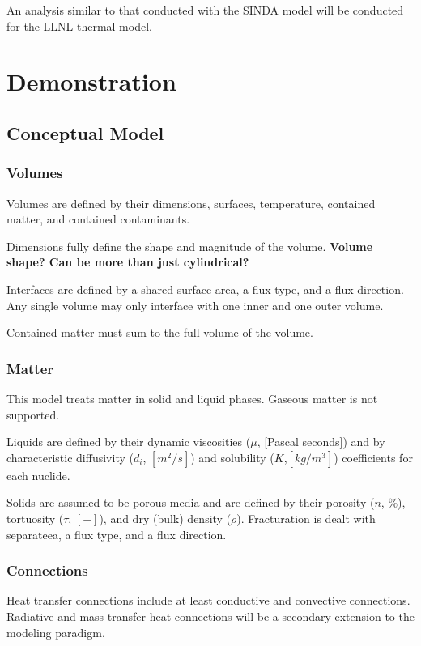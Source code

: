 An analysis similar to that conducted with the SINDA model will be conducted 
for the LLNL thermal model.

\section{Demonstration}

\subsection{Conceptual Model}

\subsubsection{Volumes}

Volumes are defined by their dimensions, surfaces, temperature, contained matter, and 
contained contaminants. 

Dimensions fully define the shape and magnitude of the volume.
\textbf{Volume shape? Can be more than just cylindrical?}

Interfaces are defined by a shared surface area, a flux type, and a flux 
direction. Any single volume may only interface with one inner and one outer 
volume. 

Contained matter must sum to the full volume of the volume.

\subsubsection{Matter}

This model treats matter in solid and liquid phases. Gaseous matter is not 
supported. 


Liquids are defined by their dynamic viscosities ($\mu$, [Pascal seconds]) and
by characteristic diffusivity ($d_i$, $[m^2/s]$) and solubility ($K$,$[kg/m^3]$) 
coefficients for each nuclide.  


Solids are assumed to be porous media and are defined by their porosity 
($n$, $\%$), tortuosity ($\tau$, $[-]$), and dry (bulk) density ($\rho$). 
Fracturation is dealt with separateea, a flux type, and a flux 
direction.  

\subsubsection{Connections}

Heat transfer connections include at least conductive and convective connections. 
Radiative and mass transfer heat connections will be a secondary extension to 
the modeling paradigm. 

